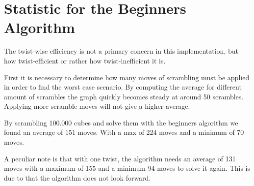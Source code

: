 \section{Statistic for the Beginners Algorithm}
The twist-wise efficiency is not a primary concern in this implementation, but how twist-efficient or rather how twist-inefficient it is. 

First it is necessary to determine how many moves of scrambling must be applied in order to find the worst case scenario. By computing the average for different amount of scrambles the graph quickly becomes steady at around 50 scrambles. Applying more scramble moves will not give a higher average. 

By scrambling 100.000 cubes and solve them with the beginners algorithm we found an average of 151 moves. With a max of 224 moves and a minimum of 70 moves. 

A peculiar note is that with one twist, the algorithm needs an average of 131 moves with a maximum of 155 and a minimum 94 moves to solve it again. This is due to that the algorithm does not look forward. 